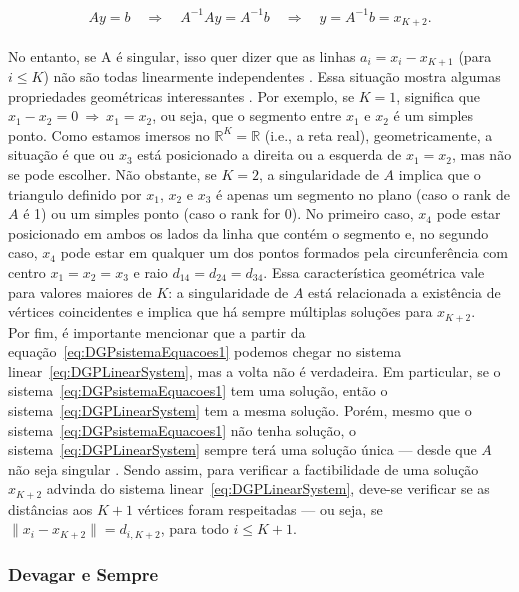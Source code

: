 \begin{equation}
	Ay = b \quad \Rightarrow \quad A^{-1}Ay = A^{-1}b \quad \Rightarrow \quad y = A^{-1}b = x_{K+2}.
\end{equation}
\\

No entanto, se A é singular, isso quer dizer que as linhas $a_i = x_i - x_{K+1}$ (para $i\leq K$) não são todas linearmente independentes \cite{AlgebraLinearElon}. Essa situação mostra algumas propriedades geométricas interessantes \cite{libertiEDG}. Por exemplo, se $K=1$, significa que $x_1 - x_2 = 0 \ \Rightarrow \  x_1 = x_2$, ou seja, que o segmento entre $x_1$ e $x_2$ é um simples ponto. Como estamos imersos no $\mathbb{R}^{K} = \mathbb{R}$ (i.e., a reta real), geometricamente, a situação é que ou $x_3$ está posicionado a direita ou a esquerda de $x_1 = x_2$, mas não se pode escolher. Não obstante, se $K = 2$, a singularidade de $A$ implica que o triangulo definido por $x_1$, $x_2$ e $x_3$ é apenas um segmento no plano (caso o rank de $A$ é 1) ou um simples ponto (caso o rank for 0). No primeiro caso, $x_4$ pode estar posicionado em ambos os lados da linha que contém o segmento e, no segundo caso, $x_4$ pode estar em qualquer um dos pontos formados pela circunferência com centro $x_1 = x_2 = x_3$ e raio $d_{14} = d_{24} = d_{34}$. 
Essa característica geométrica vale para valores maiores de $K$: a singularidade de $A$ está relacionada a existência de vértices coincidentes e implica que há sempre múltiplas soluções para $x_{K+2}$.\\

Por fim, é importante mencionar que a partir da equação~\ref{eq:DGPsistemaEquacoes1} podemos chegar no sistema linear~\ref{eq:DGPLinearSystem}, mas a volta não é verdadeira. Em particular, se o sistema~\ref{eq:DGPsistemaEquacoes1} tem uma solução, então o sistema~\ref{eq:DGPLinearSystem} tem a mesma solução. Porém, mesmo que o sistema~\ref{eq:DGPsistemaEquacoes1} não tenha solução, o sistema~\ref{eq:DGPLinearSystem} sempre terá uma solução única --- desde que $A$ não seja singular \cite{libertiEDG}. Sendo assim, para verificar a factibilidade de uma solução $x_{K+2}$ advinda do sistema linear~\ref{eq:DGPLinearSystem}, deve-se verificar se as distâncias aos $K+1$ vértices foram respeitadas --- ou seja, se $\lVert x_i -x_{K+2} \rVert = d_{i,K+2}$, para todo $i\leq K+1$. 
\\

\subsubsection{Devagar e Sempre}

